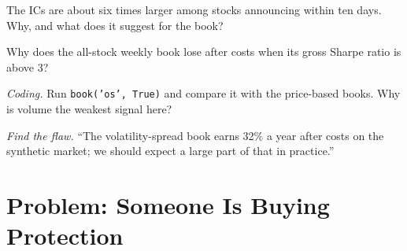 \begin{exercise}[$\star\star$]\label{exo:s1:options-implied-signals-for-stocks:5}
The ICs are about six times larger among stocks announcing within ten days. Why, and what does it suggest for the book?
\end{exercise}

\begin{exercise}[$\star\star$]\label{exo:s1:options-implied-signals-for-stocks:6}
Why does the all-stock weekly book lose after costs when its gross Sharpe ratio is above 3?
\end{exercise}

\begin{exercise}[$\star\star\star$]\label{exo:s1:options-implied-signals-for-stocks:7}
\emph{Coding.} Run \texttt{book('os', True)} and compare it with the price-based books. Why is volume the weakest signal here?
\end{exercise}

\begin{exercise}[$\star\star\star$]\label{exo:s1:options-implied-signals-for-stocks:8}
\emph{Find the flaw.} ``The volatility-spread book earns 32\% a year after costs on the synthetic market; we should expect a large part of that in practice.''
\end{exercise}

\section{Problem: Someone Is Buying Protection}

